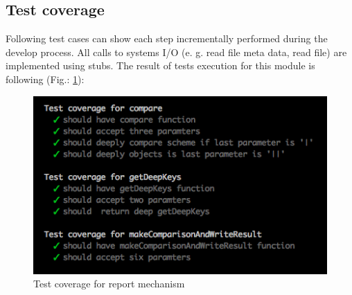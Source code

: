 \subsection{Test coverage}
Following test cases can show each step incrementally performed during the develop process. All calls to systems I/O (e. g. read file meta data, read file) are implemented using stubs.
The result of tests execution  for this module is following (Fig.: \ref{fig:testReport}): 
\begin{figure}[H]
	\centering
	\includegraphics[width=\linewidth]{grafiken/testReport.png}
	\caption{Test coverage for report mechanism}
	\label{fig:testReport}
\end{figure}

